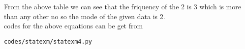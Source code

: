  From the above table we can see that the friquency of the  2 is 3 which is more than any other no so the mode of the given data is 2.\\
codes for the above equations can be get from
\begin{lstlisting}
codes/statexm/statexm4.py
\end{lstlisting}
